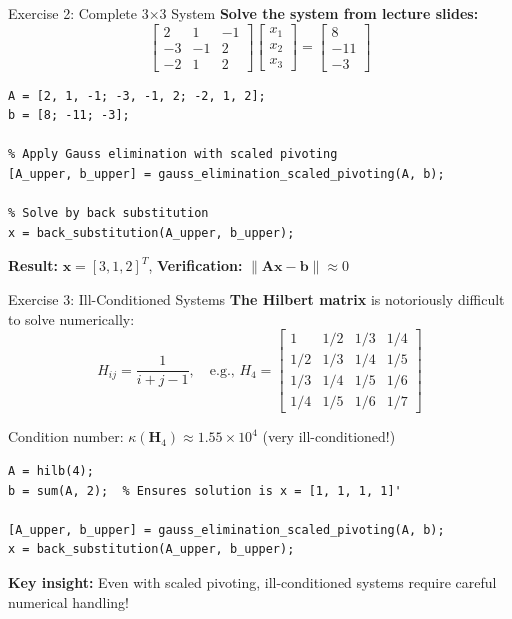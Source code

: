 \documentclass[aspectratio=169]{beamer}
\begin{document}
\begin{frame}[fragile]{Exercise 2: Complete 3×3 System}
	\textbf{Solve the system from lecture slides:}
	\begin{equation*}
		\begin{bmatrix}
			2  & 1  & -1 \\
			-3 & -1 & 2  \\
			-2 & 1  & 2
		\end{bmatrix}
		\begin{bmatrix}
			x_1 \\ x_2 \\ x_3
		\end{bmatrix}
		=
		\begin{bmatrix}
			8 \\ -11 \\ -3
		\end{bmatrix}
	\end{equation*}

	\begin{verbatim}
A = [2, 1, -1; -3, -1, 2; -2, 1, 2];
b = [8; -11; -3];

% Apply Gauss elimination with scaled pivoting
[A_upper, b_upper] = gauss_elimination_scaled_pivoting(A, b);

% Solve by back substitution
x = back_substitution(A_upper, b_upper);
    \end{verbatim}

	\footnotesize{\textbf{Result:} $\mathbf{x} = [3, 1, 2]^T$, \textbf{Verification:} $\|\mathbf{Ax} - \mathbf{b}\| \approx 0$}
\end{frame}

\begin{frame}[fragile]{Exercise 3: Ill-Conditioned Systems}
	\vspace{-0.25cm}
	\textbf{The Hilbert matrix} is notoriously difficult to solve numerically:
	\begin{equation*}
		H_{ij} = \frac{1}{i + j - 1}, \quad \text{e.g., } H_4 =
		\begin{bmatrix}
			1   & 1/2 & 1/3 & 1/4 \\
			1/2 & 1/3 & 1/4 & 1/5 \\
			1/3 & 1/4 & 1/5 & 1/6 \\
			1/4 & 1/5 & 1/6 & 1/7
		\end{bmatrix}
	\end{equation*}

	Condition number: $\kappa(\mathbf{H}_4) \approx 1.55 \times 10^4$ (very ill-conditioned!)

	\vspace{-0.25cm}
	\begin{verbatim}
A = hilb(4);
b = sum(A, 2);  % Ensures solution is x = [1, 1, 1, 1]'

[A_upper, b_upper] = gauss_elimination_scaled_pivoting(A, b);
x = back_substitution(A_upper, b_upper);
    \end{verbatim}

	\footnotesize{\textbf{Key insight:} Even with scaled pivoting, ill-conditioned systems require careful numerical handling!}
\end{frame}
\end{document}
